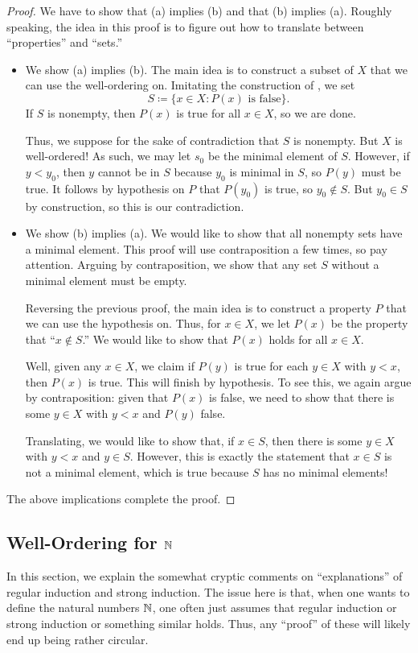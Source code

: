 \documentclass[../notes.tex]{subfiles}
\begin{document}
\begin{proof}
    We have to show that (a) implies (b) and that (b) implies (a). Roughly speaking, the idea in this proof is to figure out how to translate between ``properties'' and ``sets.''
    \begin{itemize}
        \item We show (a) implies (b). The main idea is to construct a subset of $X$ that we can use the well-ordering on. Imitating the construction of , we set
        \[S\coloneqq\{x\in X:P(x)\text{ is false}\}.\]
        If $S$ is nonempty, then $P(x)$ is true for all $x\in X$, so we are done.
    
        Thus, we suppose for the sake of contradiction that $S$ is nonempty. But $X$ is well-ordered! As such, we may let $s_0$ be the minimal element of $S$. However, if $y<y_0$, then $y$ cannot be in $S$ because $y_0$ is minimal in $S$, so $P(y)$ must be true. It follows by hypothesis on $P$ that $P(y_0)$ is true, so $y_0\notin S$. But $y_0\in S$ by construction, so this is our contradiction.

        \item We show (b) implies (a). We would like to show that all nonempty sets have a minimal element. This proof will use contraposition a few times, so pay attention. Arguing by contraposition, we show that any set $S$ without a minimal element must be empty.
        
        Reversing the previous proof, the main idea is to construct a property $P$ that we can use the hypothesis on. Thus, for $x\in X$, we let $P(x)$ be the property that ``$x\notin S$.'' We would like to show that $P(x)$ holds for all $x\in X$.

        Well, given any $x\in X$, we claim if $P(y)$ is true for each $y\in X$ with $y<x$, then $P(x)$ is true. This will finish by hypothesis. To see this, we again argue by contraposition: given that $P(x)$ is false, we need to show that there is some $y\in X$ with $y<x$ and $P(y)$ false.

        Translating, we would like to show that, if $x\in S$, then there is some $y\in X$ with $y<x$ and $y\in S$. However, this is exactly the statement that $x\in S$ is not a minimal element, which is true because $S$ has no minimal elements!
    \end{itemize}
    The above implications complete the proof.
\end{proof}

\subsection{Well-Ordering for \texorpdfstring{$\mathbb N$}{N}}
In this section, we explain the somewhat cryptic comments on ``explanations'' of regular induction and strong induction. The issue here is that, when one wants to define the natural numbers $\mathbb N$, one often just assumes that regular induction or strong induction or something similar holds. Thus, any ``proof'' of these will likely end up being rather circular.
\end{document}
